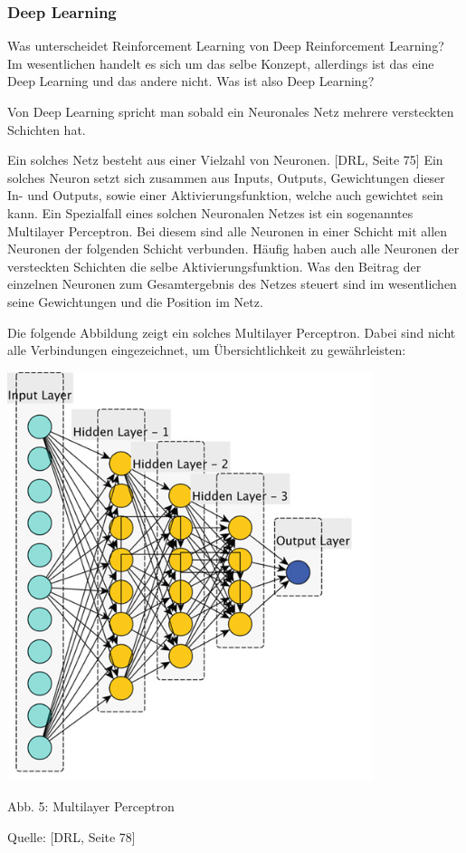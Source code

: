 \subsubsection{Deep Learning}
Was unterscheidet Reinforcement Learning von Deep Reinforcement Learning? Im wesentlichen handelt es sich um das selbe Konzept, allerdings ist das eine Deep Learning und das andere nicht. Was ist also Deep Learning?

Von Deep Learning spricht man sobald ein Neuronales Netz mehrere versteckten Schichten hat. 

Ein solches Netz besteht aus einer Vielzahl von Neuronen. [DRL, Seite 75] Ein solches Neuron setzt sich zusammen aus Inputs, Outputs, Gewichtungen dieser In- und Outputs, sowie einer Aktivierungsfunktion, welche auch gewichtet sein kann. Ein Spezialfall eines solchen Neuronalen Netzes ist ein sogenanntes Multilayer Perceptron. Bei diesem sind alle Neuronen in einer Schicht mit allen Neuronen der folgenden Schicht verbunden. Häufig haben auch alle Neuronen der versteckten Schichten die selbe Aktivierungsfunktion. Was den Beitrag der einzelnen Neuronen zum Gesamtergebnis des Netzes steuert sind im wesentlichen seine Gewichtungen und die Position im Netz.

\begin{minipage}{\linewidth}
	Die folgende Abbildung zeigt ein solches Multilayer Perceptron. Dabei sind nicht alle Verbindungen eingezeichnet, um Übersichtlichkeit zu gewährleisten:
	
	\vspace{0.5cm}
	\includegraphics[width=0.8\textwidth]{Bilder/mlp} 
	
	Abb. 5: Multilayer Perceptron
	
	Quelle: [DRL, Seite 78]\\
\end{minipage}


